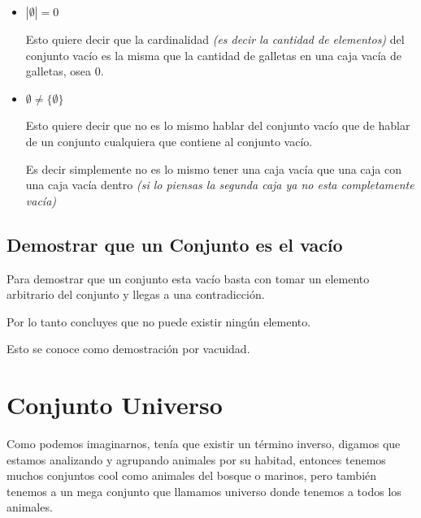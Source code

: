 \documentclass[12pt, fleqn]{report}                             %
\theoremstyle{break}                                            %
\begin{document}
                \begin{itemize}
                    \item $|\emptyset| = 0$

                            Esto quiere decir que la cardinalidad \emph{(es decir
                            la cantidad de elementos)} del conjunto vacío es la misma que 
                            la cantidad de galletas en una caja vacía de galletas, osea 0.

                    \item $\emptyset \neq \{\emptyset\}$

                            Esto quiere decir que no es lo mismo hablar del conjunto
                            vacío que de hablar de un conjunto cualquiera que contiene al
                            conjunto vacío.

                            Es decir simplemente no es lo mismo tener una caja vacía que una caja
                            con una caja vacía dentro \emph{(si lo piensas la segunda caja ya 
                            no esta completamente vacía)}
                \end{itemize}


            \subsection{Demostrar que un Conjunto es el vacío}

                Para demostrar que un conjunto esta vacío basta con tomar
                un elemento arbitrario del conjunto y llegas a una contradicción.

                Por lo tanto concluyes que no puede existir ningún elemento.

                Esto se conoce como demostración por vacuidad.


        \clearpage
        \section{Conjunto Universo}
            
            Como podemos imaginarnos, tenía que existir un término inverso, digamos que estamos
            analizando y agrupando animales por su habitad, entonces tenemos muchos conjuntos cool
            como animales del bosque o marinos, pero también tenemos a un mega conjunto que llamamos
            universo donde tenemos a todos los animales.
\end{document}
